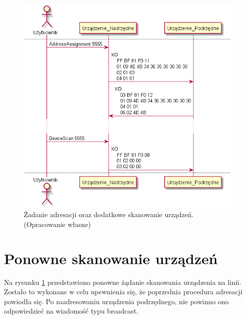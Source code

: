 \begin{figure}[h!]
    \centering
    \includegraphics[scale=0.75]{out/Diagramy/UML_DiagramOfSequence_New/UML_DiagramOfSequence_New-page2.png}
    \caption{Żadanie adresacji oraz dodatkowe skanowanie urządzeń.
        \newline(Opracowanie własne)}
    \label{fig:DiagramSequence_AddressAssignment_SecondDeviceScan}
\end{figure}


\section{Ponowne skanowanie urządzeń}
Na rysunku \ref{fig:DiagramSequence_AddressAssignment_SecondDeviceScan} przedstawiono ponowne żądanie skanowania urządzenia na linii.
Zostało to wykonane w celu upewnienia się, że poprzednia procedura adresacji powiodła się. Po zaadresowaniu urządzenia podrzędnego, nie powinno
ono odpowiedzieć na wiadomość typu broadcast.

